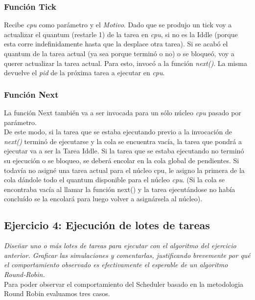 \documentclass[a4paper]{article}
\begin{document}
\subsubsection*{Funci\'on Tick}	

Recibe \emph{cpu} como par\'ametro y el \emph{Motivo}. Dado que se produjo un tick voy a actualizar el quantum (restarle 1) de la tarea en \emph{cpu}, si no es la Iddle (porque esta corre indefinidamente hasta que la desplace otra tarea). 
Si se acab\'o el quantum de la tarea actual (ya sea porque termin\'o o no) o se bloque\'o, voy a querer actualizar la tarea actual. Para esto, invocó a la funci\'on \emph{next()}. La misma devuelve el \emph{pid} de la próxima tarea a ejecutar en \emph{cpu}.

\subsubsection*{Funci\'on Next}	
	
La funci\'on Next tambi\'en va a ser invocada para un s\'olo n\'ucleo \emph{cpu} pasado por par\'ametro.\\
De este modo, si la tarea que se estaba ejecutando previo a la invocaci\'on de \emph{next()} termin\'o de ejecutarse y la cola se encuentra vac\'ia, la tarea que pondr\'a a ejecutar va a ser la Tarea Iddle.
Si la tarea que se estaba ejecutando no termin\'o su ejecuci\'on o se bloqueo, se deber\'a encolar en la cola global de pendientes.
Si todav\'ia no asign\'e una tarea actual para el n\'ucleo cpu, le asigno la primera de la cola d\'andole todo el quantum disponible para el n\'ucleo \emph{cpu}. (Si la cola se encontraba vac\'ia al llamar la funci\'on next() y la tarea ejecut\'andose no hab\'ia conclu\'ido se la encolar\'a para luego volver a asign\'arsela al n\'ucleo).\\
 
\bigskip 
 
 
 \subsection{Ejercicio 4: Ejecuci\'on de lotes de tareas}
 
\textit{Dise\~nar uno o m\'as lotes de tareas para ejecutar con el algoritmo del ejercicio anterior. Graficar las simulaciones y comentarlas, justificando brevemente por qu\'e el comportamiento observado es efectivamente el esperable de un algoritmo Round-Robin.}\\


Para poder observar el comportamiento del Scheduler basado en la metodologia Round Robin evaluamos tres casos.
\end{document}
